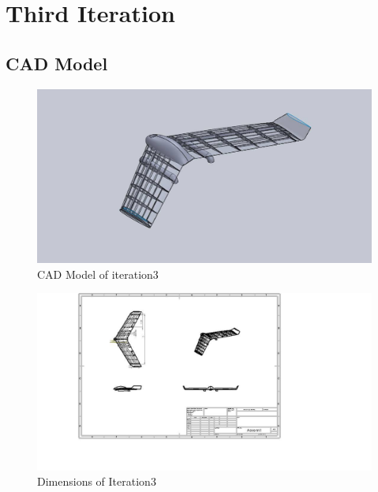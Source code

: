 \chapter{Third Iteration}
\section{CAD Model}
\begin{figure}[H]
\centering
\includegraphics[width = \textwidth]{iter3_new.png}
\caption{CAD Model of iteration3}
\end{figure}
\begin{figure}[H]
 \centering
 \includegraphics[width = 1.4\textwidth]{iter3.png}
 \caption{Dimensions of Iteration3}
\end{figure}
\newpage
